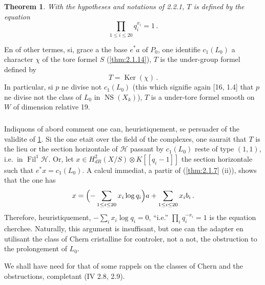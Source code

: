 \documentclass[12pt,a4paper]{article}
\theoremstyle{plain}
\newtheorem{theorem}{Theorem}[section]
\theoremstyle{definition}
\theoremstyle{remark}
\DeclareMathOperator{\Ker}{Ker}
\DeclareMathOperator{\Fil}{Fil}
\DeclareMathOperator{\NS}{NS}
\begin{document}
\begin{theorem}\label{thm:2.2.2}
With the hypotheses and notations of \emph{2.2.1}, $T$ is defined by the equation
\begin{equation}\label{eq:2.2.2.1}
\prod_{1 \leq i \leq 20} q_i^{x_i} = 1\,.\end{equation}
\end{theorem}

En of other termes, si, grace a the base $e^*a$ of $P_0$, one identifie $c_1(L_0)$ a character $\chi$ of the tore formel $S$ (\ref{thm:2.1.14}), $T$ is the under-group formel defined by
\begin{equation}\label{eq:2.2.2.2}
T = \Ker(\chi)\,.\end{equation}
In particular, si $p$ ne divise not $c_1(L_0)$ (this which signifie again [16, 1.4] that $p$ ne divise not the class of $L_0$ in $\NS(X_k)$), $T$ is a under-tore formel smooth on $W$ of dimension relative 19.

\subsubsection{}

Indiquons of abord comment one can, heuristiquement, se persuader of the validite of \ref{thm:2.2.2}. Si the one etait over the field of the complexes, one saurait that $T$ is the lieu or the section horizontale of $\mathcal{H}$ passant by $c_1(L_0)$ reste of type $(1,1)$, i.e.\ in $\Fil^1\mathcal{H}$. Or, let $x \in H_{dR}^2(X/S) \otimes K[[q_i - 1]]$ the section horizontale such that $e^*x = c_1(L_0)$. A calcul immediat, a partir of (\ref{thm:2.1.7} (ii)), shows that the one has
\begin{equation}\label{eq:2.2.3.1}
x = \Bigl(-\sum_{1 \leq i \leq 20} x_i \log q_i\Bigr)a + \sum_{1 \leq i \leq 20} x_i b_i\,.\end{equation}
Therefore, heuristiquement, $-\sum_i x_i \log q_i = 0$, ``i.e.'' $\prod_i q_i^{-x_i} = 1$ is the equation cherchee. Naturally, this argument is insuffisant, but one can the adapter en utilisant the class of Chern cristalline for controler, not a not, the obstruction to the prolongement of $L_0$.

We shall have need for that of some rappels on the classes of Chern and the obstructions, completant (IV 2.8, 2.9).

\subsubsection{}
\end{document}
